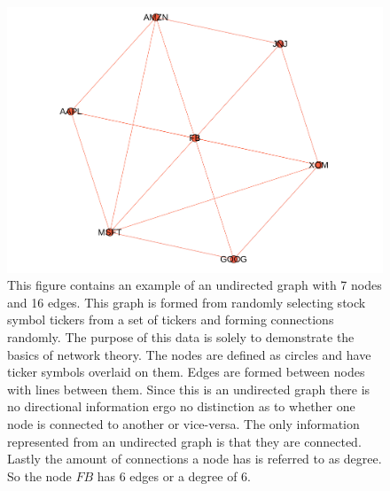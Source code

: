 \begin{figure}[!htb]
    \centering
      \centering
      \includegraphics[width=\textwidth]{figures/Intro/ExampleNetwork.pdf}

      \caption{
      This figure contains an example of an undirected graph with 7 nodes and 16 edges. This graph is formed from randomly selecting stock symbol tickers from a set of tickers and forming connections randomly. The purpose of this data is solely to demonstrate the basics of network theory. The nodes are defined as circles and have ticker symbols overlaid on them. Edges are formed between nodes with lines between them. Since this is an undirected graph there is no directional information ergo no distinction as to whether one node is connected to another or vice-versa. The only information represented from an undirected graph is that they are connected. Lastly the amount of connections a node has is referred to as degree. So the node \(FB\) has 6 edges or a degree of 6.
      }
      \label{fig:ExampleNetwork}

  \end{figure}

